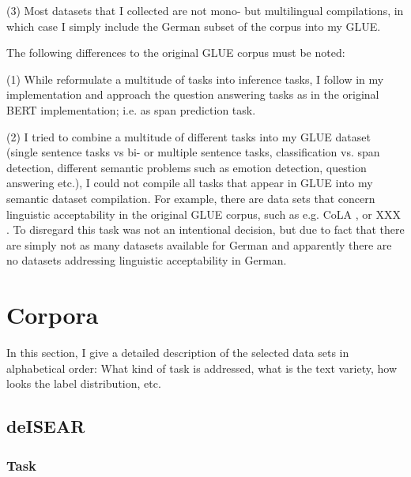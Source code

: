 (3) Most datasets that I collected are not mono- but multilingual compilations, in which case I 
simply include the German subset of the corpus into my GLUE.

The following differences to the original GLUE corpus must be noted:

(1) While \cite{wang2018glue} reformulate a multitude of tasks into inference tasks, I follow in 
my implementation \cite{zhang2019semantics} and approach the question answering tasks as 
\cite{devlin2018bert} in the original BERT implementation; i.e. as span prediction task.

(2) I tried to combine a multitude of different tasks into my GLUE dataset (single sentence tasks 
vs bi- or multiple sentence tasks, classification vs. span detection, different semantic problems 
such as emotion detection, question answering etc.), I could not compile all tasks that appear in 
GLUE into my semantic dataset compilation.
For example, there are data sets that concern linguistic acceptability in the original GLUE 
corpus, such as  e.g. CoLA \cite{warstadt2019neural}, or XXX .
To disregard this task was not an intentional decision, but due to fact that there are simply not 
as many datasets available for German and apparently there are no datasets addressing linguistic 
acceptability in German.

\section{Corpora}

In this section, I give a detailed description of the selected data sets in alphabetical order:
What kind of task is addressed, what is the text variety, how looks the label distribution, etc.

\subsection{deISEAR}

\subsubsection{Task}

